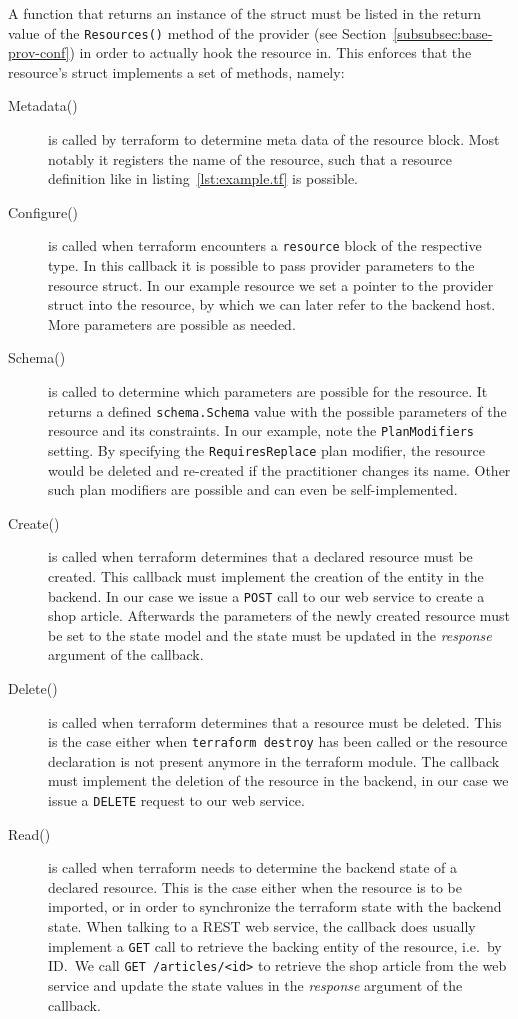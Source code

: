 \documentclass[paper=a4,11pt,numbers=noenddot]{article}
\begin{document}
A function that returns an instance of the struct must be listed in the return value of the \verb'Resources()' method of the provider (see Section~\ref{subsubsec:base-prov-conf}) in order to actually hook the resource in. This enforces that the resource's struct implements a set of methods, namely:

\begin{description}
\item[Metadata()] is called by terraform to determine meta data of the resource block. Most notably it registers the name of the resource, such that a resource definition like in listing~\ref{lst:example.tf} is possible.
\item[Configure()] is called when terraform encounters a \verb'resource' block of the respective type. In this callback it is possible to pass provider parameters to the resource struct. In our example resource we set a pointer to the provider struct into the resource, by which we can later refer to the backend host. More parameters are possible as needed.
\item[Schema()] is called to determine which parameters are possible for the resource. It returns a defined \verb'schema.Schema' value with the possible parameters of the resource and its constraints. In our example, note the \verb'PlanModifiers' setting. By specifying the \verb'RequiresReplace' plan modifier, the resource would be deleted and re-created if the practitioner changes its name. Other such plan modifiers are possible and can even be self-implemented.
\item[Create()] is called when terraform determines that a declared resource must be created. This callback must implement the creation of the entity in the backend. In our case we issue a \verb'POST' call to our web service to create a shop article. Afterwards the parameters of the newly created resource must be set to the state model and the state must be updated in the \emph{response} argument of the callback.
\item[Delete()] is called when terraform determines that a resource must be deleted. This is the case either when \verb'terraform destroy' has been called or the resource declaration is not present anymore in the terraform module. The callback must implement the deletion of the resource in the backend, in our case we issue a \verb'DELETE' request to our web service.
\item[Read()] is called when terraform needs to determine the backend state of a declared resource. This is the case either when the resource is to be imported, or in order to synchronize the terraform state with the backend state. When talking to a REST web service, the callback does usually implement a \verb'GET' call to retrieve the backing entity of the resource, i.e.\ by ID.\ We call \verb'GET /articles/<id>' to retrieve the shop article from the web service and update the state values in the \emph{response} argument of the callback.

\end{description}
\end{document}
